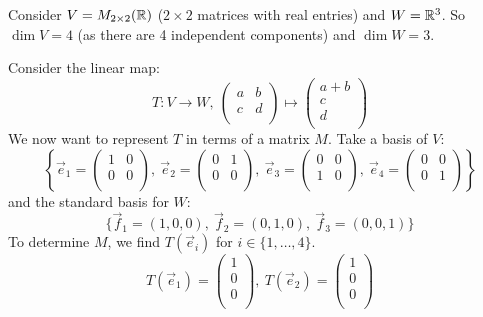 \documentclass[../main.tex]{subfiles}
\begin{document}
\begin{example} \label{identificationExample}
  Consider $V = M_{2\times2}(\mathbb{R})$ ($2\times2$ matrices with real entries) and $W = \mathbb{R}^{3}$.
  So $\dim V = 4$ (as there are 4 independent components) and $\dim W = 3$.

  Consider the linear map:
  \[
    T: V \to W,\ \begin{pmatrix}
    a & b \\
    c & d \\
    \end{pmatrix} \mapsto
    \begin{pmatrix}
    a + b \\
    c \\
    d \\
    \end{pmatrix}
  \]
  We now want to represent $T$ in terms of a matrix $M$.
  Take a basis of $V$:
  \[
    \left\{
    \vec{e}_1 = \begin{pmatrix}
    1 & 0 \\
    0 & 0 \\
    \end{pmatrix},\
    \vec{e}_2 = \begin{pmatrix}
    0 & 1 \\
    0 & 0 \\
    \end{pmatrix},\
    \vec{e}_3 = \begin{pmatrix}
    0 & 0 \\
    1 & 0 \\
    \end{pmatrix},\
    \vec{e}_4 = \begin{pmatrix}
    0 & 0 \\
    0 & 1 \\
    \end{pmatrix}
    \right\}
  \]
  and the standard basis for $W$:
  \[
    \{\vec{f}_1 = (1, 0, 0),\ \vec{f}_2 = (0, 1, 0),\ \vec{f}_3 = (0, 0, 1)\}
  \]
  To determine $M$, we find $T(\vec{e}_i)$ for $i \in \{1, \ldots, 4\}$.
  \[
    T(\vec{e}_1) = \begin{pmatrix}
    1 \\
    0 \\
    0 \\
    \end{pmatrix},\
    T(\vec{e}_2) = \begin{pmatrix}
    1 \\
    0 \\
    0 \\

\end{pmatrix}\]
\end{example}
\end{document}
